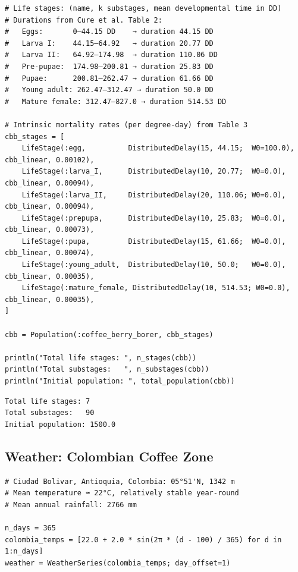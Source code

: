 \begin{verbatim}
# Life stages: (name, k substages, mean developmental time in DD)
# Durations from Cure et al. Table 2:
#   Eggs:       0–44.15 DD    → duration 44.15 DD
#   Larva I:    44.15–64.92   → duration 20.77 DD
#   Larva II:   64.92–174.98  → duration 110.06 DD
#   Pre-pupae:  174.98–200.81 → duration 25.83 DD
#   Pupae:      200.81–262.47 → duration 61.66 DD
#   Young adult: 262.47–312.47 → duration 50.0 DD
#   Mature female: 312.47–827.0 → duration 514.53 DD

# Intrinsic mortality rates (per degree-day) from Table 3
cbb_stages = [
    LifeStage(:egg,          DistributedDelay(15, 44.15;  W0=100.0), cbb_linear, 0.00102),
    LifeStage(:larva_I,      DistributedDelay(10, 20.77;  W0=0.0),   cbb_linear, 0.00094),
    LifeStage(:larva_II,     DistributedDelay(20, 110.06; W0=0.0),   cbb_linear, 0.00094),
    LifeStage(:prepupa,      DistributedDelay(10, 25.83;  W0=0.0),   cbb_linear, 0.00073),
    LifeStage(:pupa,         DistributedDelay(15, 61.66;  W0=0.0),   cbb_linear, 0.00074),
    LifeStage(:young_adult,  DistributedDelay(10, 50.0;   W0=0.0),   cbb_linear, 0.00035),
    LifeStage(:mature_female, DistributedDelay(10, 514.53; W0=0.0),  cbb_linear, 0.00035),
]

cbb = Population(:coffee_berry_borer, cbb_stages)

println("Total life stages: ", n_stages(cbb))
println("Total substages:   ", n_substages(cbb))
println("Initial population: ", total_population(cbb))
\end{verbatim}




\begin{verbatim}
Total life stages: 7
Total substages:   90
Initial population: 1500.0
\end{verbatim}



\subsection{Weather: Colombian Coffee Zone}



\label{8853342514029127182}{}



\begin{verbatim}
# Ciudad Bolivar, Antioquia, Colombia: 05°51'N, 1342 m
# Mean temperature ≈ 22°C, relatively stable year-round
# Mean annual rainfall: 2766 mm

n_days = 365
colombia_temps = [22.0 + 2.0 * sin(2π * (d - 100) / 365) for d in 1:n_days]
weather = WeatherSeries(colombia_temps; day_offset=1)
\end{verbatim}




